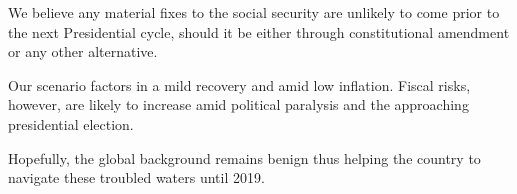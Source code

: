 \documentclass[11pt]{article}
\author{user}
\date{\today}
\title{}
\begin{document}
\begin{compactitem}
\item We believe any material fixes to the social security are unlikely
to come prior to the next Presidential cycle, should it be either
through constitutional amendment or any other alternative.
\item Our scenario factors in a mild recovery and amid low
inflation. Fiscal risks, however, are likely to increase amid
political paralysis and the approaching presidential election.
\item Hopefully, the global background remains benign thus helping the
country to navigate these troubled waters until 2019.
\end{compactitem}
\end{document}
